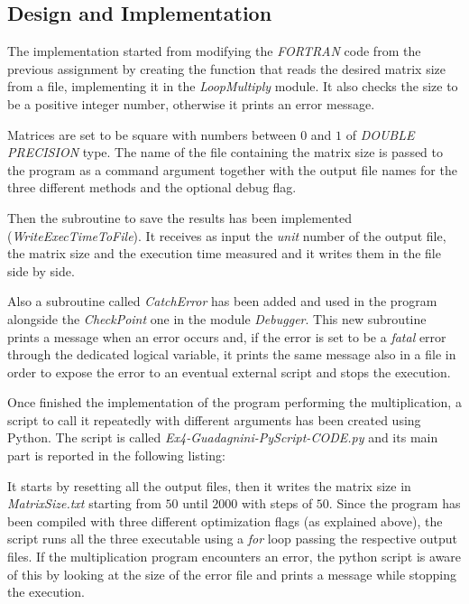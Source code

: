 \documentclass[11pt,a4paper]{article}
\begin{document}
\subsection{Design and Implementation}
The implementation started from modifying the \textit{FORTRAN} code from the previous assignment by creating the function that reads the desired matrix size from a file, implementing it in the \textit{LoopMultiply} module. It also checks the size to be a positive integer number, otherwise it prints an error message.

%

Matrices are set to be square with numbers between $0$ and $1$ of \textit{DOUBLE PRECISION} type.
The name of the file containing the matrix size is passed to the program as a command argument together with the output file names for the three different methods and the optional debug flag.

Then the subroutine to save the results has been implemented (\textit{WriteExecTimeToFile}). It receives as input the \textit{unit} number of the output file, the matrix size and the execution time measured and it writes them in the file side by side.

Also a subroutine called \textit{CatchError} has been added and used in the program alongside the \textit{CheckPoint} one in the module \textit{Debugger}. 
This new subroutine prints a message when an error occurs and, if the error is set to be a \textit{fatal} error through the dedicated logical variable, it prints the same message also in a file in order to expose the error to an eventual external script and stops the execution.

Once finished the implementation of the program performing the multiplication, a script to call it repeatedly with different arguments has been created using Python.
The script is called \textit{Ex4-Guadagnini-PyScript-CODE.py} and its main part is reported in the following listing:


It starts by resetting all the output files, then it writes the matrix size in \textit{MatrixSize.txt} starting from $50$ until $2000$ with steps of $50$.
Since the program has been compiled with three different optimization flags (as explained above), the script runs all the three executable using a \textit{for} loop passing the respective output files.
If the multiplication program encounters an error, the python script is aware of this by looking at the size of the error file and prints a message while stopping the execution.
\end{document}
